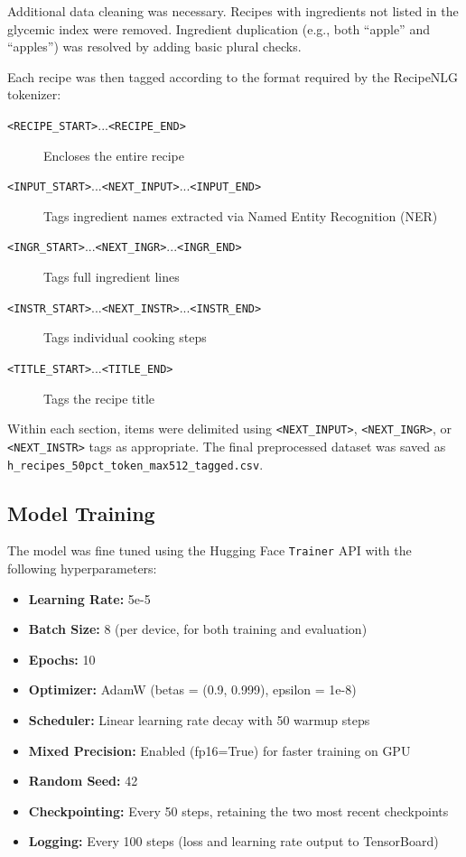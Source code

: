 Additional data cleaning was necessary. Recipes with ingredients not listed in the glycemic index were removed. Ingredient duplication (e.g., both “apple” and “apples”) was resolved by adding basic plural checks.

Each recipe was then tagged according to the format required by the RecipeNLG tokenizer:

\begin{description}
	\item[\texttt{<RECIPE\_START>}...\texttt{<RECIPE\_END>}] Encloses the entire recipe
	\item[\texttt{<INPUT\_START>}...\texttt{<NEXT\_INPUT>}...\texttt{<INPUT\_END>}] Tags ingredient names extracted via Named Entity Recognition (NER)
	\item[\texttt{<INGR\_START>}...\texttt{<NEXT\_INGR>}...\texttt{<INGR\_END>}] Tags full ingredient lines
	\item[\texttt{<INSTR\_START>}...\texttt{<NEXT\_INSTR>}...\texttt{<INSTR\_END>}] Tags individual cooking steps
	\item[\texttt{<TITLE\_START>}...\texttt{<TITLE\_END>}] Tags the recipe title
\end{description}

Within each section, items were delimited using \texttt{<NEXT\_INPUT>}, \texttt{<NEXT\_INGR>}, or \texttt{<NEXT\_INSTR>} tags as appropriate. The final preprocessed dataset was saved as \texttt{h\_recipes\_50pct\_token\_max512\_tagged.csv}.

\subsection{Model Training}
The model was fine tuned using the Hugging Face \texttt{Trainer} API \cite{wolf2019huggingface} with the following hyperparameters:

\begin{itemize}
	\item \textbf{Learning Rate:} 5e-5
	\item \textbf{Batch Size:} 8 (per device, for both training and evaluation)
	\item \textbf{Epochs:} 10
	\item \textbf{Optimizer:} AdamW (betas = (0.9, 0.999), epsilon = 1e-8)
	\item \textbf{Scheduler:} Linear learning rate decay with 50 warmup steps
	\item \textbf{Mixed Precision:} Enabled (fp16=True) for faster training on GPU
	\item \textbf{Random Seed:} 42
	\item \textbf{Checkpointing:} Every 50 steps, retaining the two most recent checkpoints
	\item \textbf{Logging:} Every 100 steps (loss and learning rate output to TensorBoard)
\end{itemize}

